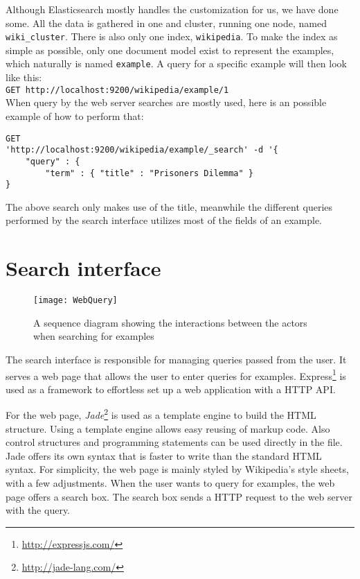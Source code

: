 Although Elasticsearch mostly handles the customization for us, we have done some. All the data is gathered in one and cluster, running one node, named \texttt{wiki\_cluster}. There is also only one index, \texttt{wikipedia}. To make the index as simple as possible, only one document model exist to represent the examples, which naturally is named \texttt{example}. A query for a specific example will then look like this:\\
\texttt{GET http://localhost:9200/wikipedia/example/1}\\
When query by the web server searches are mostly used, here is an possible example of how to perform that:
\begin{Verbatim}[fontsize=\small]
GET 
'http://localhost:9200/wikipedia/example/_search' -d '{
    "query" : {
        "term" : { "title" : "Prisoners Dilemma" }
}
\end{Verbatim}
The above search only makes use of the title, meanwhile the different queries performed by the search interface utilizes most of the fields of an example.


\section{Search interface}

\begin{figure}[H] 
\caption{A sequence diagram showing the interactions between the actors when searching for examples}
\texttt{[image: WebQuery]}
\label{fig:web_query}
\end{figure}

The search interface is responsible for managing queries passed from the user. It serves a web page that allows the user to enter queries for examples. Express\footnote{\url{http://expressjs.com/}} is used as a framework to effortless set up a web application with a HTTP API.

For the web page, \textit{Jade}\footnote{\url{http://jade-lang.com/}} is used as a template engine to build the HTML structure. Using a template engine allows easy reusing of markup code. Also control structures and programming statements can be used directly in the file. Jade offers its own syntax that is faster to write than the standard HTML syntax. For simplicity, the web page is mainly styled by Wikipedia's style sheets, with a few adjustments. When the user wants to query for examples, the web page offers a search box. The search box sends a HTTP request to the web server with the query.

